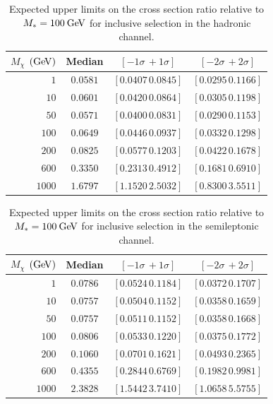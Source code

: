 \begin{table}[!ht]
\centering
\begin{tabular}{|r|c|c|c|}
\hline
  $M_\chi$ $(\mathrm{Ge\kern -0.1em V})$ & Median & $\left[-1\sigma\, +1\sigma\right]$ & $\left[-2\sigma\, +2\sigma\right]$ \\
\hline
  $1$               & $0.0581$ & $\left[0.0407\, 0.0845\right]$ & $\left[0.0295\, 0.1166\right]$ \\
  $10$              & $0.0601$ & $\left[0.0420\, 0.0864\right]$ & $\left[0.0305\, 0.1198\right]$ \\
  $50$              & $0.0571$ & $\left[0.0400\, 0.0831\right]$ & $\left[0.0290\, 0.1153\right]$ \\
  $100$             & $0.0649$ & $\left[0.0446\, 0.0937\right]$ & $\left[0.0332\, 0.1298\right]$ \\
  $200$             & $0.0825$ & $\left[0.0577\, 0.1203\right]$ & $\left[0.0422\, 0.1678\right]$ \\
  $600$             & $0.3350$ & $\left[0.2313\, 0.4912\right]$ & $\left[0.1681\, 0.6910\right]$ \\
  $1000$            & $1.6797$ & $\left[1.1520\, 2.5032\right]$ & $\left[0.8300\, 3.5511\right]$ \\
\hline
\end{tabular}
\caption{Expected upper limits on the cross section ratio relative to $M_*=100\:\mathrm{Ge\kern -0.1em V}$ for inclusive selection in the hadronic channel.}
\label{tab:rLimits_hadronic_comboshape}
\end{table}

\begin{table}[!ht]
\centering
\begin{tabular}{|r|c|c|c|}
\hline
  $M_\chi$ $(\mathrm{Ge\kern -0.1em V})$ & Median & $\left[-1\sigma\, +1\sigma\right]$ & $\left[-2\sigma\, +2\sigma\right]$ \\
\hline
  $1$               & $0.0786$ & $\left[0.0524\, 0.1184\right]$ & $\left[0.0372\, 0.1707\right]$ \\
  $10$              & $0.0757$ & $\left[0.0504\, 0.1152\right]$ & $\left[0.0358\, 0.1659\right]$ \\
  $50$              & $0.0757$ & $\left[0.0511\, 0.1152\right]$ & $\left[0.0358\, 0.1668\right]$ \\
  $100$             & $0.0806$ & $\left[0.0533\, 0.1220\right]$ & $\left[0.0375\, 0.1772\right]$ \\
  $200$             & $0.1060$ & $\left[0.0701\, 0.1621\right]$ & $\left[0.0493\, 0.2365\right]$ \\
  $600$             & $0.4355$ & $\left[0.2844\, 0.6769\right]$ & $\left[0.1982\, 0.9981\right]$ \\
  $1000$            & $2.3828$ & $\left[1.5442\, 3.7410\right]$ & $\left[1.0658\, 5.5755\right]$ \\
\hline
\end{tabular}
\caption{Expected upper limits on the cross section ratio relative to $M_*=100\:\mathrm{Ge\kern -0.1em V}$ for inclusive selection in the semileptonic channel.}
\label{tab:rLimits_semilept_comboshape}
\end{table}

